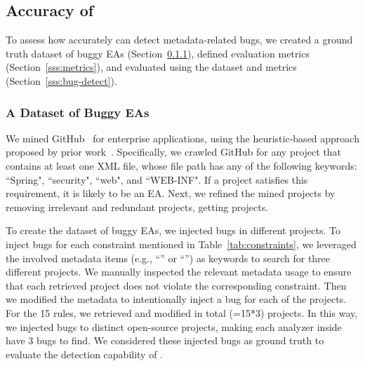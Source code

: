   \vspace{-.5em}
\subsection{Accuracy of \tool}\label{ss:eval-effect-mecheck}

To assess how accurately \tool can detect metadata-related bugs, we created a ground truth dataset of buggy EAs (Section~\ref{sss:data}), defined evaluation metrics (Section~\ref{sss:metrics}), and evaluated \tool using the dataset and metrics (Section~\ref{sss:bug-detect}). 

  \vspace{-.5em}
\subsubsection{A Dataset of Buggy EAs} \label{sss:data}
We mined GitHub~\cite{github} for enterprise applications, using the heuristic-based approach proposed by prior work~\cite{Wen20}. Specifically, we crawled GitHub for any project that contains at least one XML file, whose file path has any of the following keywords: ``Spring", ``security", ``web", and ``WEB-INF". If a project satisfies this requirement, it is likely to be an EA. 
Next, we refined the mined projects by removing irrelevant and redundant projects, getting \totalProject projects.

To create the dataset of buggy EAs, we injected \totalInjection bugs in \totalInjectedProject different projects. To inject bugs for each constraint mentioned in Table~\ref{tab:constraints}, we leveraged the involved metadata items (e.g., ``'' or ``'') as keywords to search for three different projects. We manually inspected the relevant metadata usage to ensure that each retrieved project does not violate the corresponding constraint. Then we modified the metadata to intentionally inject a bug for each of the projects. For the 15 rules, we retrieved and modified in total \totalInjectedProject(=15*3) projects. In this way, we injected \totalInjection bugs to \totalInjectedProject distinct open-source projects, making each analyzer inside \tool have 3 bugs to find. We considered these \totalInjection injected bugs as ground truth to evaluate the detection capability of \tool.



